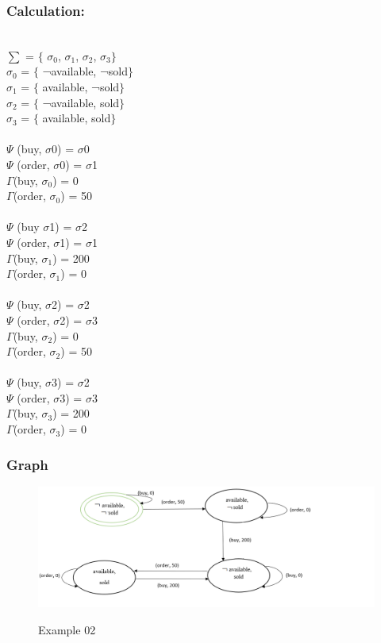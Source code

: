 \documentclass[11pt]{article}
\begin{document}
	\subsubsection{Calculation:}\label{par:p302}
	\indent \\
	$ \sum $ = $ \{ $ $ \sigma _{0}$, $ \sigma _{1}$, $ \sigma _{2}$, $ \sigma _{3}$$ \} $ \\
	$ \sigma _{0}$ = $ \{ $ ¬available, ¬sold$ \} $ \\
	$ \sigma _{1}$ = $ \{ $ available, ¬sold$ \} $ \\
	$ \sigma _{2}$ = $ \{ $ ¬available, sold$ \} $ \\
	$ \sigma _{3}$ = $ \{ $ available, sold$ \} $ \\
	\\
	\(  \Psi  \)  (buy, $ \sigma $0) = $ \sigma $0\\
	\(  \Psi  \)  (order, $ \sigma $0) = $ \sigma $1\\
	\(\Gamma\)(buy, $\sigma_{0}$) = 0\\
	\(\Gamma\)(order, $\sigma_{0}$) = 50\\
	\\
	\(  \Psi  \)  (buy $ \sigma $1) = $ \sigma $2\\
	\(  \Psi  \)  (order, $ \sigma $1) = $ \sigma $1\\
	\(\Gamma\)(buy, $\sigma_{1}$) = 200\\
	\(\Gamma\)(order, $\sigma_{1}$) = 0\\
	\\
	\(  \Psi  \)  (buy, $ \sigma $2) = $ \sigma $2\\
	\(  \Psi  \)  (order, $ \sigma $2) = $ \sigma $3\\
	\(\Gamma\)(buy, $\sigma_{2}$) = 0\\
	\(\Gamma\)(order, $\sigma_{2}$) = 50\\
	\\
	\(  \Psi  \)  (buy, $ \sigma $3) = $ \sigma $2\\
	\(  \Psi  \)  (order, $ \sigma $3) = $ \sigma $3\\
	\(\Gamma\)(buy, $\sigma_{3}$) = 200\\
	\(\Gamma\)(order, $\sigma_{3}$) = 0\\

	\subsubsection{Graph}\label{par:p402}
	\begin{figure}[H]
		\includegraphics[width=1.2\linewidth, height=0.4\textheight]{./media/example2_graph.png}
		\label{Figure:f02}
		\caption{Example 02}
	\end{figure}
\end{document}
